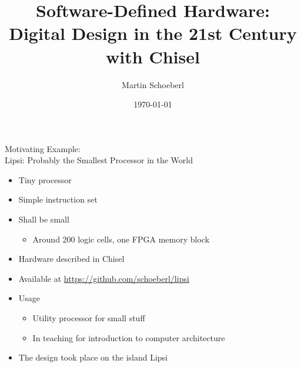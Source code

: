 

\newif\ifbook


\title{Software-Defined Hardware: Digital Design in the 21st Century with Chisel}
\author{Martin Schoeberl}
\date{\today}



\begin{frame}
\titlepage
\end{frame}


\begin{frame}[fragile]{Motivating Example:\\
Lipsi: Probably the Smallest Processor in the World}
\begin{itemize}
\item Tiny processor
\item Simple instruction set
\item Shall be small
\begin{itemize}
\item Around 200 logic cells, one FPGA memory block
\end{itemize}
\item Hardware described in Chisel
\item Available at \url{https://github.com/schoeberl/lipsi}
\item Usage
\begin{itemize}
\item Utility processor for small stuff
\item In teaching for introduction to computer architecture
\end{itemize}
\item The design took place on the island Lipsi
\end{itemize}
\end{frame}

